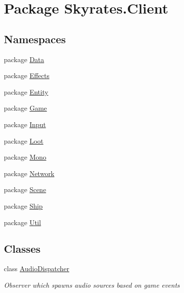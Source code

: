 \hypertarget{namespace_skyrates_1_1_client}{\section{Package Skyrates.\-Client}
\label{namespace_skyrates_1_1_client}
}
\subsection*{Namespaces}
\begin{DoxyCompactItemize}
\item 
package \hyperlink{namespace_skyrates_1_1_client_1_1_data}{Data}
\item 
package \hyperlink{namespace_skyrates_1_1_client_1_1_effects}{Effects}
\item 
package \hyperlink{namespace_skyrates_1_1_client_1_1_entity}{Entity}
\item 
package \hyperlink{namespace_skyrates_1_1_client_1_1_game}{Game}
\item 
package \hyperlink{namespace_skyrates_1_1_client_1_1_input}{Input}
\item 
package \hyperlink{namespace_skyrates_1_1_client_1_1_loot}{Loot}
\item 
package \hyperlink{namespace_skyrates_1_1_client_1_1_mono}{Mono}
\item 
package \hyperlink{namespace_skyrates_1_1_client_1_1_network}{Network}
\item 
package \hyperlink{namespace_skyrates_1_1_client_1_1_scene}{Scene}
\item 
package \hyperlink{namespace_skyrates_1_1_client_1_1_ship}{Ship}
\item 
package \hyperlink{namespace_skyrates_1_1_client_1_1_util}{Util}
\end{DoxyCompactItemize}
\subsection*{Classes}
\begin{DoxyCompactItemize}
\item 
class \hyperlink{class_skyrates_1_1_client_1_1_audio_dispatcher}{Audio\-Dispatcher}
\begin{DoxyCompactList}\small\item\em Observer which spawns audio sources based on game events \end{DoxyCompactList}\end{DoxyCompactItemize}
